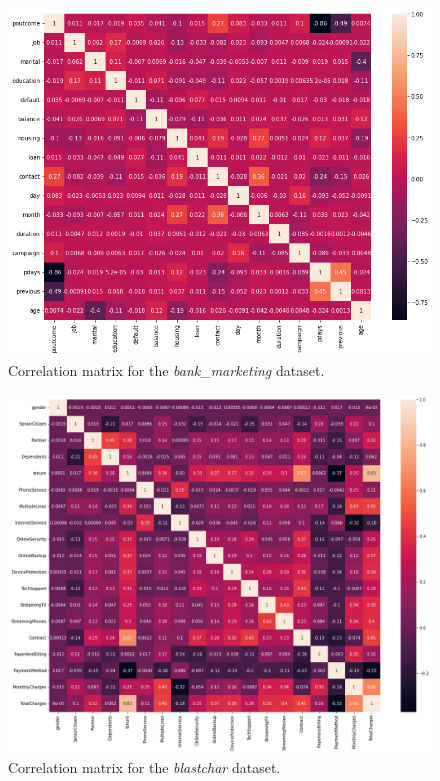 \documentclass{article}
\begin{document}
\begin{figure}[hpt]
  \begin{center}
      \includegraphics[width=11.5cm]{bank-correlation.png}
  \end{center}
  \caption{Correlation matrix for the \textit{bank\_marketing} dataset.}
  \label{fig:correlation-bank}
\end{figure}

\begin{figure}[hpt]
  \begin{center}
      \includegraphics[width=12.5cm]{blastchar-correlation.png}
  \end{center}
  \caption{Correlation matrix for the \textit{blastchar} dataset.}
  \label{fig:correlation-blastchar}
\end{figure}
\end{document}

